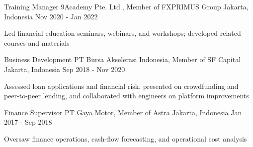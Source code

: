 \begin{cventries}
  \cventry
    {Training Manager} %
    {9Academy Pte. Ltd., Member of FXPRIMUS Group } %
    {Jakarta, Indonesia} %
    {Nov 2020 - Jan 2022} %
    {
      \begin{cvitems} %
        \item {Led financial education seminars, webinars, and workshops; developed related courses and materials}
      \end{cvitems}
    }

  \cventry
    {Business Development} %
    {PT Bursa Akselerasi Indonesia, Member of SF Capital} %
    {Jakarta, Indonesia} %
    {Sep 2018 - Nov 2020} %
    {
      \begin{cvitems} %
        \item {Assessed loan applications and financial risk, presented on crowdfunding and peer-to-peer lending, and collaborated with engineers on platform improvements}
      \end{cvitems}
    }

  \cventry
    {Finance Supervisor} %
    {PT Gaya Motor, Member of Astra} %
    {Jakarta, Indonesia} %
    {Jan 2017 - Sep 2018} %
    {
      \begin{cvitems} %
        \item {Oversaw finance operations, cash-flow forecasting, and operational cost analysis}
      \end{cvitems}
    }



\end{cventries}
